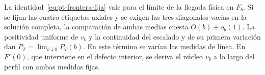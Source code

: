 La identidad~\eqref{eq:pt-frontera-fija} vale para el límite de la llegada física en
\(F_b\). Si se fijan las cuatro etiquetas axiales y se exigen las tres diagonales vacías
en la solución completa, la comparación de ambas medias cuesta \(O(b)+o_b(1)\).
La positividad uniforme de \(v_b\) y la continuidad del escalado y de su primera variación
dan \(P_T=\lim_{b\downarrow0}P_T(b)\). En este término se varían las medidas de línea.
En \(F'(0)\), que interviene en el defecto interior, se deriva el núcleo \(v_b\) a lo
largo del perfil con ambas medidas fijas.
